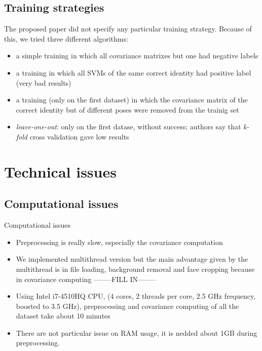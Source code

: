 \documentclass{beamer}
\begin{document}
\subsection{Training strategies}
\begin{frame}
	The proposed paper did not specify any particular training strategy.
	Because of this, we tried three different algorithms:
	\begin{itemize}
		\item a simple training in which all covariance matrixes but
			one had negative labels
		\item a training in which all SVMs of the same correct identity
			had positive label (very bad results)
		\item a training (only on the first dataset) in which the
			covariance matrix of the correct identity but of
			different poses were removed from the trainig set
		\item \textit{leave-one-out}: only on the first datase, without
			success; authors say that \textit{k-fold} cross
			validation gave low results
	\end{itemize}
\end{frame}

\section{Technical issues}
\subsection{Computational issues}
\begin{frame}{Computational issues}
	\begin{itemize}
		\item Preprocessing is really slow, especially the covariance
			computation
		\item We implemented multithread version but the main advantage
			given by the multithread is in file loading, background
			removal and face cropping because in covariance
			computing --------FILL IN--------
		\item Using Intel i7-4510HQ CPU, (4 cores, 2 threads per core,
			2.5 GHz frequency, boosted to 3.5 GHz), preprocessing
			and covariance computing of all the dataset take about
			10 minutes
		\item There are not particular issue on RAM usage, it is nedded
			about 1GB during preprocessing.
	\end{itemize}
\end{frame}
\end{document}
